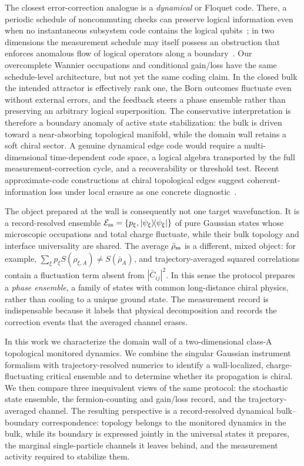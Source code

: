 \documentclass[aps,prl,twocolumn,nofootinbib,superscriptaddress]{revtex4-2}
\newcommand{\cE}{\mathcal{E}}
\newcommand{\ketbra}[2]{\lvert #1\rangle\!\langle #2\rvert}
\begin{document}
The closest error-correction analogue is a \emph{dynamical} or Floquet code.  There, a periodic schedule of noncommuting checks can preserve logical information even when no instantaneous subsystem code contains the logical qubits~\cite{HastingsHaah2021}; in two dimensions the measurement schedule may itself possess an obstruction that enforces anomalous flow of logical operators along a boundary~\cite{AasenHaahLiMong2023}.  Our overcomplete Wannier occupations and conditional gain/loss have the same schedule-level architecture, but not yet the same coding claim.  In the closed bulk the intended attractor is effectively rank one, the Born outcomes fluctuate even without external errors, and the feedback steers a phase ensemble rather than preserving an arbitrary logical superposition.  The conservative interpretation is therefore a boundary anomaly of active state stabilization: the bulk is driven toward a near-absorbing topological manifold, while the domain wall retains a soft chiral sector.  A genuine dynamical edge code would require a multi-dimensional time-dependent code space, a logical algebra transported by the full measurement-correction cycle, and a recoverability or threshold test.  Recent approximate-code constructions at chiral topological edges suggest coherent-information loss under local erasure as one concrete diagnostic~\cite{SongEtAl2026}.

The object prepared at the wall is consequently not one target wavefunction.  It is a record-resolved ensemble $\cE_{\rm ss}=\{p_\xi,\ketbra{\psi_\xi}{\psi_\xi}\}$ of pure Gaussian states whose microscopic occupations and total charge fluctuate, while their bulk topology and interface universality are shared.  The average $\bar\rho_{\rm ss}$ is a different, mixed object: for example, $\sum_\xi p_\xi S(\rho_{\xi,A})\neq S(\bar\rho_A)$, and trajectory-averaged squared correlations contain a fluctuation term absent from $|\bar C_{ij}|^2$.  In this sense the protocol prepares a \emph{phase ensemble}, a family of states with common long-distance chiral physics, rather than cooling to a unique ground state.  The measurement record is indispensable because it labels that physical decomposition and records the correction events that the averaged channel erases.

In this work we characterize the domain wall of a two-dimensional class-A topological monitored dynamics.  We combine the singular Gaussian instrument formalism with trajectory-resolved numerics to identify a wall-localized, charge-fluctuating critical ensemble and to determine whether its propagation is chiral.  We then compare three inequivalent views of the same protocol: the stochastic state ensemble, the fermion-counting and gain/loss record, and the trajectory-averaged channel.  The resulting perspective is a record-resolved dynamical bulk--boundary correspondence: topology belongs to the monitored dynamics in the bulk, while its boundary is expressed jointly in the universal states it prepares, the marginal single-particle channels it leaves behind, and the measurement activity required to stabilize them.

\clearpage


\end{document}
